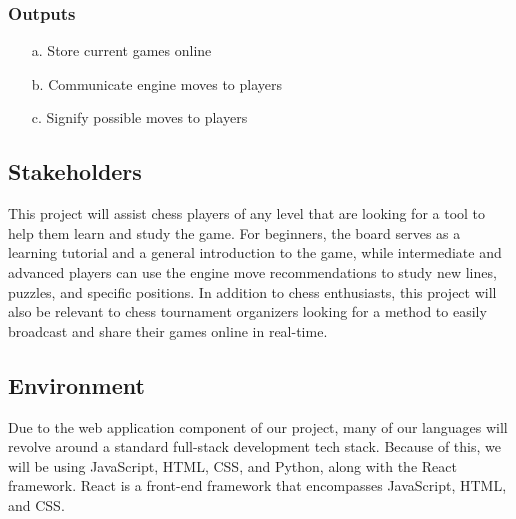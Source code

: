 \documentclass{article}
\begin{document}
\subsubsection{Outputs}
\begin{enumerate}
    \item[a.] Store current games online
    \item[b.] Communicate engine moves to players
    \item[c.] Signify possible moves to players
\end{enumerate}

\subsection{Stakeholders}
{This project will assist chess players of any level that are looking for a tool to help them learn and study the game. 
For beginners, the board serves as a learning tutorial and a general introduction to the game, while intermediate and advanced players can use the engine move recommendations to study new lines, puzzles, and specific positions. 
In addition to chess enthusiasts, this project will also be relevant to chess tournament organizers looking for a method to easily broadcast and share their games online in real-time. }

\subsection{Environment}
{Due to the web application component of our project, many of our languages will revolve around a standard full-stack development tech stack. 
Because of this, we will be using JavaScript, HTML, CSS, and Python, along with the React framework. React is a front-end framework that encompasses JavaScript, HTML, and CSS.}

\medskip
{}

\medskip
{}
\end{document}
